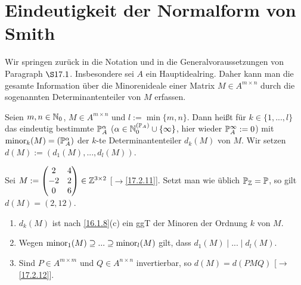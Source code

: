\documentclass[../../main.tex]{subfiles}
\begin{document}
\section{Eindeutigkeit der Normalform von Smith}

Wir springen zurück in die Notation und in die Generalvoraussetzungen von Paragraph $\S 17.1$. Insbesondere sei $A$ ein Hauptidealring. Daher kann man die gesamte Information über die Minorenideale einer Matrix $M\in A^{m\times n}$ durch die sogenannten Determinantenteiler von $M$ erfassen.

\begin{df}\label{17.3.1}
Seien $m,n\in \N_0$, $M\in A^{m\times n}$ und $l:=\min\{m,n\}$. Dann heißt für $k\in\{1,...,l\}$ das eindeutig bestimmte $\P_A^\alpha$ ($\alpha\in\expfam\cup\{\infty\}$, hier wieder $\P_A^\infty:=0$) mit $\minor_k(M)=(\P_A^\alpha)$ der $k$-te Determinantenteiler $d_k(M)$ von $M$. Wir setzen $d(M):=(d_1(M),...,d_l(M))$.
\end{df}

\begin{bsp}\label{17.3.2}
Sei $M:=\begin{pmatrix}2 & 4\\-2&2\\0&6\end{pmatrix}\in \Z^{3\times 2}$ [$\to$\ref{17.2.11}]. Setzt man wie üblich $\P_\Z=\P$, so gilt $d(M)=(2,12)$.
\end{bsp}

\begin{bem}\label{17.3.3}
\begin{enumerate}[\normalfont(a)]
\item $d_k(M)$ ist nach \ref{16.1.8}(c) ein ggT der Minoren der Ordnung $k$ von $M$.
\item Wegen $\minor_1(M)\supseteq...\supseteq \minor_l(M)$ gilt, dass $d_1(M)\mid...\mid d_l(M)$.
\item Sind $P\in A^{m\times m}$ und $Q\in A^{n\times n}$ invertierbar, so $d(M)=d(PMQ)$ [$\to$\ref{17.2.12}].
\end{enumerate}
\end{bem}
\end{document}
